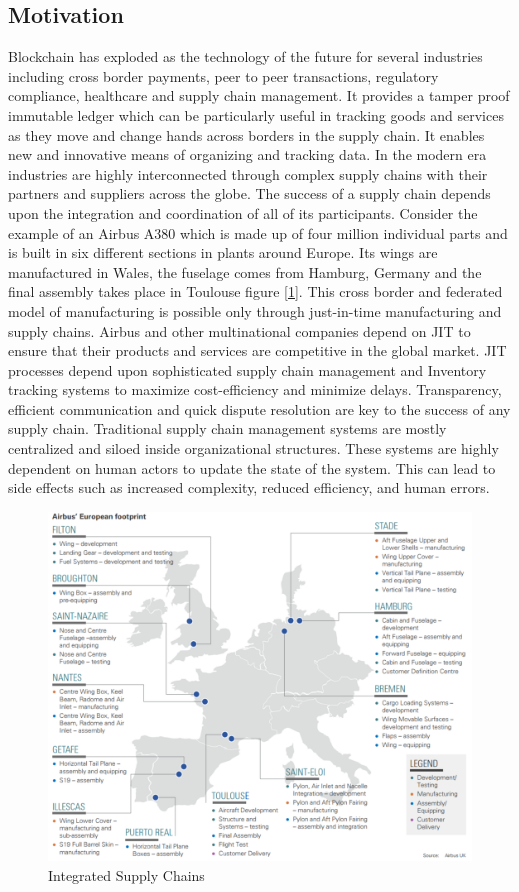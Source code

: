 \subsection{Motivation}
Blockchain has exploded as the technology of the future for several industries including cross border payments, peer to peer transactions, regulatory compliance, healthcare and supply chain management. It provides a tamper proof immutable ledger which can be particularly useful in tracking goods and services as they move and change hands across borders in the supply chain. It enables new and innovative means of organizing and tracking data. In the modern era industries are highly interconnected through complex supply chains with their partners and suppliers across the globe. The success of a supply chain depends upon the integration and coordination of all of its participants. Consider the example of an Airbus A380 which is made up of four million individual parts and is built in six different sections in plants around Europe. Its wings are manufactured in Wales, the fuselage comes from Hamburg, Germany and the final assembly takes place in Toulouse figure [\ref{fig:Airbus}]. This cross border and federated model of manufacturing is possible only through just-in-time manufacturing and supply chains. Airbus and other multinational companies depend on JIT to ensure that their products and services are competitive in the global market. JIT processes depend upon sophisticated supply chain management and Inventory tracking systems to maximize cost-efficiency and minimize delays. Transparency, efficient communication and quick dispute resolution are key to the success of any supply chain. Traditional supply chain management systems are mostly centralized and siloed inside organizational structures. These systems are highly dependent on human actors to update the state of the system. This can lead to side effects such as increased complexity, reduced efficiency, and human errors.

\clearpage 
\begin{figure}[b]
	\centering
    \includegraphics[width=160mm,scale=0.5]{figs/Airbus-1}
	\caption{Integrated Supply Chains \cite{Airbus:ADS}}
	\label{fig:Airbus} 
\end{figure} 
\clearpage

